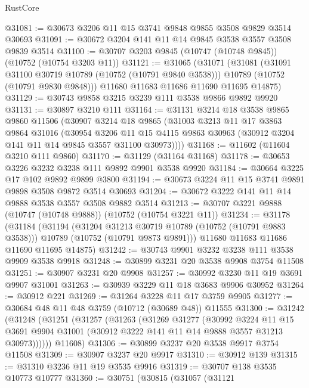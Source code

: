 \begin{lexlean}{RustCore}
\begin{coremodule}
@31081 := @30673 @3206 @11 @15 @3741 @9848 @9855 @3508 @9829 @3514 @30693
@31091 := @30672 @3204 @141 @11 @14 @9845 @3538 @3557 @3508 @9839 @3514
@31100 := @30707 @3203 @9845 (@10747 (@10748 @9845)) (@10752 (@10754 @3203 @11))
@31121 := @31065
    (@31071
      (@31081
        (@31091 @31100 @30719 @10789 (@10752 (@10791 @9840 @3538)))
        @10789
        (@10752 (@10791 @9830 @9848)))
      @11680
      @11683
      @11686
      @11690
      @11695
      @14875)
@31129 := @30743 @9858 @3215 @3239 @111 @3538 @9866 @9892 @9920
@31131 := @30897 @3210 @111
@31164 := @31131
    @3214
    @18
    @3538
    @9865
    @9860
    @11506
    (@30907
      @3214
      @18
      @9865
      (@31003
        @3213
        @11
        @17
        @3863
        @9864
        @31016
        (@30954
          @3206
          @11
          @15
          @4115
          @9863
          @30963
          (@30912 @3204 @141 @11 @14 @9845 @3557 @31100 @30973))))
@31168 := @11602 (@11604 @3210 @111 @9860)
@31170 := @31129 (@31164 @31168)
@31178 := @30653 @3226 @3232 @3238 @111 @9892 @9901 @3538 @9920
@31184 := @30664 @3225 @17 @102 @9892 @9899 @3800
@31194 := @30673 @3224 @11 @15 @3741 @9891 @9898 @3508 @9872 @3514 @30693
@31204 := @30672 @3222 @141 @11 @14 @9888 @3538 @3557 @3508 @9882 @3514
@31213 := @30707 @3221 @9888 (@10747 (@10748 @9888)) (@10752 (@10754 @3221 @11))
@31234 := @31178
    (@31184
      (@31194
        (@31204 @31213 @30719 @10789 (@10752 (@10791 @9883 @3538)))
        @10789
        (@10752 (@10791 @9873 @9891)))
      @11680
      @11683
      @11686
      @11690
      @11695
      @14875)
@31242 := @30743 @9901 @3232 @3238 @111 @3538 @9909 @3538 @9918
@31248 := @30899 @3231 @20 @3538 @9908 @3754 @11508
@31251 := @30907 @3231 @20 @9908
@31257 := @30992 @3230 @11 @19 @3691 @9907 @31001
@31263 := @30939 @3229 @11 @18 @3683 @9906 @30952
@31264 := @30912 @221
@31269 := @31264 @3228 @11 @17 @3759 @9905
@31277 := @30684 @48 @11 @48 @3759 (@10712 (@30689 @48)) @11555
@31300 := @31242
    (@31248
      (@31251
        (@31257
          (@31263
            (@31269
              @31277
              (@30992
                @3224
                @11
                @15
                @3691
                @9904
                @31001
                (@30912 @3222 @141 @11 @14 @9888 @3557 @31213 @30973))))))
      @11608)
@31306 := @30899 @3237 @20 @3538 @9917 @3754 @11508
@31309 := @30907 @3237 @20 @9917
@31310 := @30912 @139
@31315 := @31310 @3236 @11 @19 @3535 @9916
@31319 := @30707 @138 @3535 @10773 @10777
@31360 := @30751
    (@30815
      (@31057
        (@31121

\end{coremodule}
\end{lexlean}
